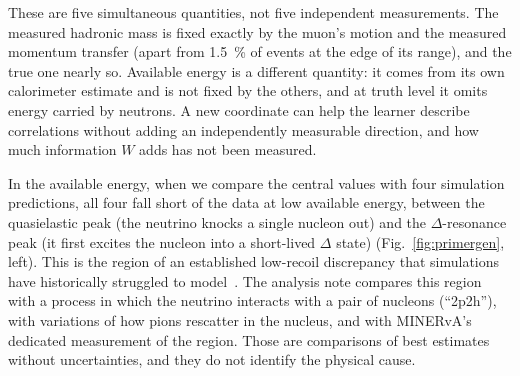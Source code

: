 These are five simultaneous quantities, not five independent measurements. The measured hadronic mass is fixed exactly by the muon's motion and the measured momentum transfer (apart from \SI{1.5}{\percent} of events at the edge of its range), and the true one nearly so. Available energy is a different quantity: it comes from its own calorimeter estimate and is not fixed by the others, and at truth level it omits energy carried by neutrons. A new coordinate can help the learner describe correlations without adding an independently measurable direction, and how much information $W$ adds has not been measured.

In the available energy, when we compare the central values with four simulation predictions, all four fall short of the data at low available energy, between the quasielastic peak (the neutrino knocks a single nucleon out) and the $\Delta$-resonance peak (it first excites the nucleon into a short-lived $\Delta$ state) (Fig.~\ref{fig:primergen}, left). This is the region of an established low-recoil discrepancy that simulations have historically struggled to model~\cite{MINERvA:2016lowrecoil,MINERvA:2022incl}. The analysis note compares this region with a process in which the neutrino interacts with a pair of nucleons (``2p2h''), with variations of how pions rescatter in the nucleus, and with MINERvA's dedicated measurement of the region. Those are comparisons of best estimates without uncertainties, and they do not identify the physical cause.

